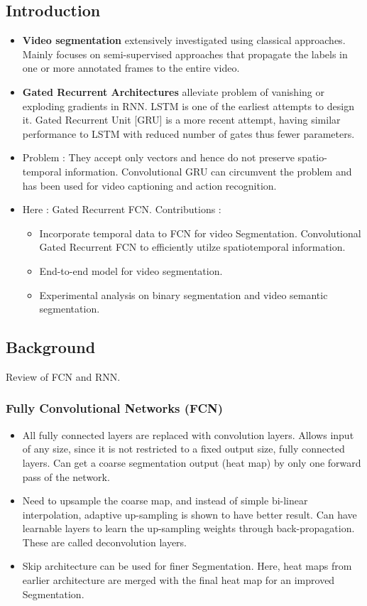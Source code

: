 \documentclass{article}
\begin{document}
\subsection{Introduction}
\begin{itemize}
\item \textbf{Video segmentation} extensively investigated using classical approaches. Mainly focuses on semi-supervised approaches that propagate the labels in one or more annotated frames to the entire video.
\item \textbf{Gated Recurrent Architectures} alleviate problem of vanishing or exploding gradients in RNN. LSTM is one of the earliest attempts to design it. Gated Recurrent Unit [GRU] is a more recent attempt, having similar performance to LSTM with reduced number of gates thus fewer parameters.
\item Problem : They accept only vectors and hence do not preserve spatio-temporal information. Convolutional GRU can circumvent the problem and has been used for video captioning and action recognition.
\item Here : Gated Recurrent FCN. Contributions :
  \begin{itemize}
  \item Incorporate temporal data to FCN for video Segmentation. Convolutional Gated Recurrent FCN to efficiently utilze spatiotemporal information.
  \item End-to-end model for video segmentation.
  \item Experimental analysis on binary segmentation and video semantic segmentation.
  \end{itemize}
\end{itemize}

\subsection{Background}
Review of FCN and RNN.
\subsubsection{Fully Convolutional Networks (FCN)}
\begin{itemize}
\item All fully connected layers are replaced with convolution layers. Allows input of any size, since it is not restricted to a fixed output size, fully connected layers. Can get a coarse segmentation output (heat map) by only one forward pass of the network.
\item Need to upsample the coarse map, and instead of simple bi-linear interpolation, adaptive up-sampling is shown to have better result. Can have learnable layers to learn the up-sampling weights through back-propagation. These are called deconvolution layers.
\item Skip architecture can be used for finer Segmentation. Here, heat maps from earlier architecture are merged with the final heat map for an improved  Segmentation.
\end{itemize}
\end{document}
